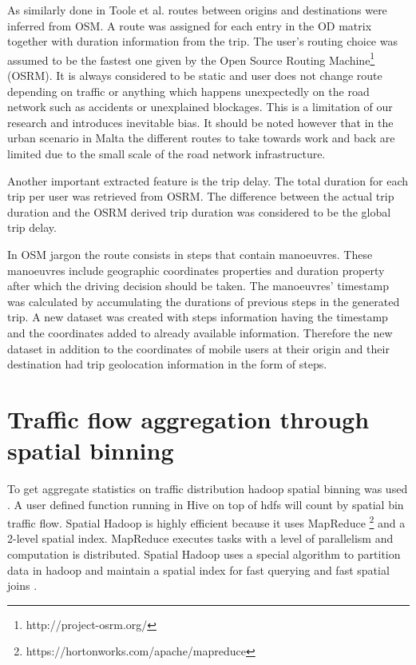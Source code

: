 \documentclass[12pt, a4paper]{report}
\theoremstyle{definition}
\theoremstyle{definition}%
\theoremstyle{definition}%
\theoremstyle{definition}%
\theoremstyle{definition}%
\theoremstyle{definition}%
\begin{document}

As similarly done in Toole et al. \cite{Toole2015} routes between origins and destinations were inferred from OSM. A route was assigned for each entry in the OD matrix together with duration information from the trip. The user's routing choice was assumed to be the fastest one given by the Open Source Routing Machine\footnote{http://project-osrm.org/} (OSRM). It is always considered to be static and user does not change route depending on traffic or anything which happens unexpectedly on the road network such as accidents or unexplained blockages. This is a limitation of our research and introduces inevitable bias. It should be noted however that in the urban scenario in Malta the different routes to take towards work and back are limited due to the small scale of the road network infrastructure. 

Another important extracted feature is the trip delay. The total duration for each trip per user was retrieved from OSRM. The difference between the actual trip duration and the OSRM derived trip duration was considered to be the global trip delay.

In OSM jargon the route consists in steps that contain manoeuvres. These manoeuvres include geographic coordinates properties and duration property after which the driving decision should be taken. The manoeuvres' timestamp was calculated by accumulating the durations of previous steps in the generated trip. A new dataset was created with steps information having the timestamp and the coordinates added to already available information. Therefore the new dataset in addition to the coordinates of mobile users at their origin and their destination had trip geolocation information in the form of steps.
 


\section{Traffic flow aggregation through spatial binning}

To get aggregate statistics on traffic distribution hadoop spatial binning was used \cite{Eldawy}. A user defined function running in Hive on top of hdfs will count by spatial bin traffic flow. Spatial Hadoop is highly efficient because it uses MapReduce \footnote{https://hortonworks.com/apache/mapreduce} and a 2-level spatial index. MapReduce executes tasks with a level of parallelism and computation is distributed. Spatial Hadoop uses a special algorithm to partition data in hadoop and maintain a spatial index for fast querying and fast spatial joins \cite{Eldawy}.
\end{document}
